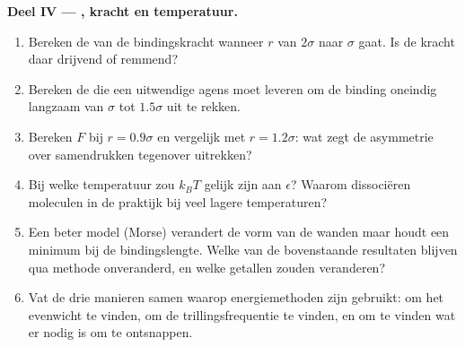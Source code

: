 \begin{problem}
\medskip
\noindent\textbf{Deel IV --- , kracht en temperatuur.}
\begin{enumerate}[resume]
  \item Bereken de  van de bindingskracht wanneer $r$ van $2\sigma$
        naar $\sigma$ gaat. Is de kracht daar drijvend of remmend?
  \item Bereken de  die een uitwendige agens moet leveren om de binding
        oneindig langzaam van $\sigma$ tot $1.5\sigma$ uit te rekken.
  \item Bereken $F$ bij $r = 0.9\sigma$ en vergelijk met $r = 1.2\sigma$:
        wat zegt de asymmetrie over samendrukken tegenover uitrekken?
  \item Bij welke temperatuur zou $k_BT$ gelijk zijn aan $\epsilon$? Waarom
        dissociëren moleculen in de praktijk bij veel lagere temperaturen?
  \item Een beter model (Morse) verandert de vorm van de wanden maar houdt
        een minimum bij de bindingslengte. Welke van de bovenstaande resultaten blijven
        qua methode onveranderd, en welke getallen zouden veranderen?
  \item Vat de drie manieren samen waarop energiemethoden zijn gebruikt: om het
        evenwicht te vinden, om de trillingsfrequentie te vinden, en om te vinden wat
        er nodig is om te ontsnappen.
\end{enumerate}
\end{problem}
